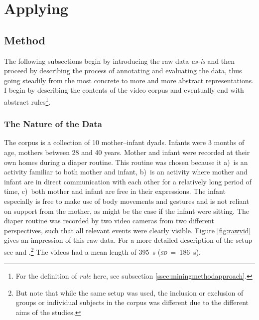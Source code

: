 
\chapter{Applying \fpmupper}
\label{ch:mining}

\section{Method}
\label{sec:miningmethod}
The following subsections begin by introducing the raw data \emph{as-is} and then proceed by describing the process of annotating and evaluating the data, thus going steadily from the most concrete to more and more abstract representations. I begin by describing the contents of the video corpus and eventually end with abstract rules\footnote{For the definition of \emph{rule} here, see subsection \ref{ssec:miningmethodapproach}.}.

\subsection{The Nature of the Data}
\label{ssec:miningmethodnature}
The corpus is a collection of 10 mother--infant dyads. Infants were 3 months of age, mothers between 28 and 40 years. Mother and infant were recorded at their own homes during a diaper routine. This routine was chosen because it a)~is an activity familiar to both mother and infant, b)~is an activity where mother and infant are in direct communication with each other for a relatively long period of time, c)~both mother and infant are free in their expressions. The infant especially is free to make use of body movements and gestures and is not reliant on support from the mother, as might be the case if the infant were sitting. The diaper routine was recorded by two video cameras from two different perspectives, such that all relevant events were clearly visible. Figure \ref{fig:rawvid} gives an impression of this raw data. For a more detailed description of the setup see \citet[]{nomikou17} and \citet[]{nomikou11}.\footnote{But note that while the same setup was used, the inclusion or exclusion of groups or individual subjects in the corpus was different due to the different aims of the studies.} The videos had a mean length of 395~s (\emph{\textsc{sd}}~=~186~s).

